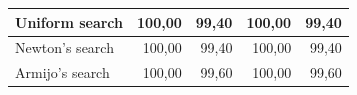 \documentclass[english, 12pt, a4paper, sci, utf8, a-1b, online, table]{aaltothesis}
\begin{document}
\begin{table}[H]
\begin{tabular}{|l|r|r|r|r|}
    Uniform search                                                             & 100,00                                                   & \cellcolor[HTML]{F7D9D7}99,40                             & 100,00                                                    & \cellcolor[HTML]{F7D9D7}99,40                             \\ \hline
    Newton's search                                                             & 100,00                                                   & \cellcolor[HTML]{F7D9D7}99,40                             & 100,00                                                    & \cellcolor[HTML]{F7D9D7}99,40                             \\ \hline
    Armijo's search                                                              & 100,00                                                   & 99,60                                                     & 100,00                                                    & 99,60                                                     \\ \hline
    \end{tabular}
\end{table}
\end{document}
